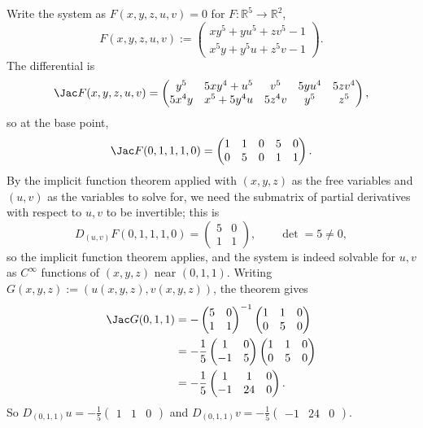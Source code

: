 \begin{exercisesolution}
Write the system as $F(x,y,z,u,v) = 0$ for $F : \mathbb{R}^5 \to \mathbb{R}^2$,
\[F(x,y,z,u,v) := \begin{pmatrix} xy^5+yu^5+zv^5-1 \\ x^5y+y^5u+z^5v-1 \end{pmatrix}.\]
The differential is
\[\Jac F(x,y,z,u,v) = \begin{pmatrix} y^5 & 5xy^4+u^5 & v^5 & 5yu^4 & 5zv^4 \\ 5x^4y & x^5+5y^4u & 5z^4v & y^5 & z^5 \end{pmatrix},\]
so at the base point,
\[\Jac F(0,1,1,1,0) = \begin{pmatrix} 1 & 1 & 0 & 5 & 0 \\ 0 & 5 & 0 & 1 & 1 \end{pmatrix}.\]
By the implicit function theorem applied with $(x,y,z)$ as the free variables and $(u,v)$ as the
variables to solve for, we need the submatrix of partial derivatives with respect to $u,v$ to be
invertible; this is
\[D_{(u,v)}F(0,1,1,1,0) = \begin{pmatrix} 5 & 0 \\ 1 & 1\end{pmatrix}, \qquad \det = 5 \neq 0,\]
so the implicit function theorem applies, and the system is indeed solvable for $u,v$ as
$C^\infty$ functions of $(x,y,z)$ near $(0,1,1)$. Writing $G(x,y,z) := (u(x,y,z),v(x,y,z))$, the
theorem gives
\begin{align*}
\Jac G(0,1,1)
  &= -\begin{pmatrix}5&0\\1&1\end{pmatrix}^{-1}\begin{pmatrix}1&1&0\\0&5&0\end{pmatrix} \\
  &= -\frac15\begin{pmatrix}1&0\\-1&5\end{pmatrix}\begin{pmatrix}1&1&0\\0&5&0\end{pmatrix} \\
  &= -\frac15\begin{pmatrix}1&1&0\\-1&24&0\end{pmatrix}.
\end{align*}
So $D_{(0,1,1)}u = -\tfrac15\left(\begin{smallmatrix}1&1&0\end{smallmatrix}\right)$ and
$D_{(0,1,1)}v = -\tfrac15\left(\begin{smallmatrix}-1&24&0\end{smallmatrix}\right)$.
\end{exercisesolution}

